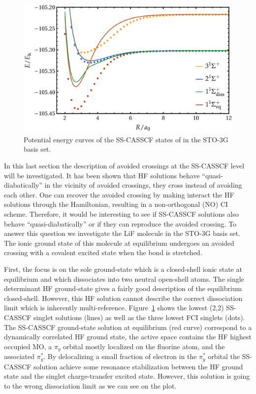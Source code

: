 \documentclass[aps,prb,reprint,showkeys,superscriptaddress]{revtex4-1}
\begin{document}
\begin{figure}
  \centering
  \includegraphics[width=0.9\linewidth]{Figures/fig_7.pdf}
  \caption{Potential energy curves of the SS-CASSCF states of  in the STO-3G basis set. \label{fig:fig_9}}
\end{figure}

In this last section the description of avoided crossings at the SS-CASSCF level will be investigated.
It has been shown that HF solutions behave ``quasi-diabatically'' in the vicinity of avoided crossings, \ie they cross instead of avoiding each other. \cite{Thom_2009}
One can recover the avoided crossing by making interact the HF solutions through the Hamiltonian, resulting in a non-orthogonal (NO) CI scheme. \cite{Burton_2019}
Therefore, it would be interesting to see if SS-CASSCF solutions also behave ``quasi-diabatically'' or if they can reproduce the avoided crossing.
To answer this question we investigate the LiF molecule in the STO-3G basis set.
The ionic ground state of this molecule at equilibrium undergoes an avoided crossing with a covalent excited state when the bond is stretched. \cite{Bauschlicher_1988,Thom_2009,Mahler_2021}

First, the focus is on the sole ground-state which is a closed-shell ionic state at equilibrium and which dissociates into two neutral open-shell atoms.
The single determinant HF ground-state gives a fairly good description of the equilibrium closed-shell.
However, this HF solution cannot describe the correct dissociation limit which is inherently multi-reference. \cite{Thom_2009}
Figure~\ref{fig:fig_9} shows the lowest (2,2) SS-CASSCF singlet solutions (lines) as well as the three lowest FCI singlets (dots).
The SS-CASSCF ground-state solution at equilibrium (red curve) correspond to a dynamically correlated HF ground state, \ie the active space contains the HF highest occupied MO, a $\pi_y$ orbital mostly localized on the fluorine atom, and the associated $\pi_y^*$.
By delocalizing a small fraction of electron in the $\pi_y^*$ orbital the SS-CASSCF solution achieve some resonance stabilization between the HF ground state and the singlet charge-transfer excited state.
However, this solution is going to the wrong dissociation limit as we can see on the plot.
\end{document}
